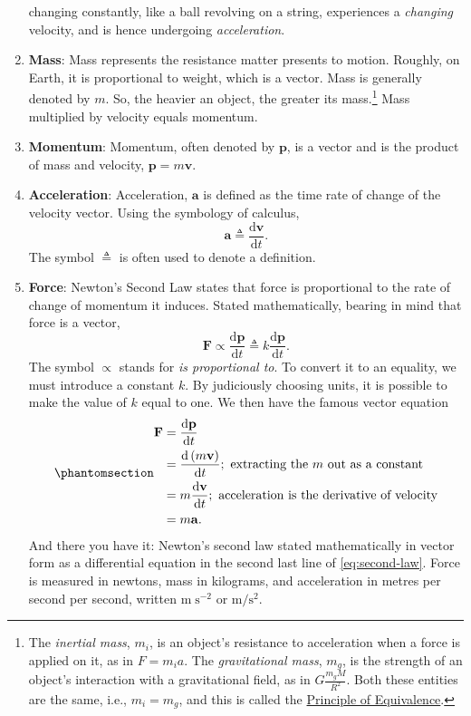 \documentclass[
  a4paper,
]{article}
\begin{document}
\begin{enumerate}
  changing constantly, like a ball revolving on a string, experiences a
  \emph{changing} velocity, and is hence undergoing \emph{acceleration}.
\item
  \textbf{Mass}: Mass represents the resistance matter presents to
  motion. Roughly, on Earth, it is proportional to weight, which is a
  vector. Mass is generally denoted by \(m\). So, the heavier an object,
  the greater its mass.\footnote{The \emph{inertial mass}, \(m_i\), is
    an object's resistance to acceleration when a force is applied on
    it, as in \(F = m_{i}a\). The \emph{gravitational mass}, \(m_g\), is
    the strength of an object's interaction with a gravitational field,
    as in \(G\frac{m_gM}{R^2}\). Both these entities are the same, i.e.,
    \(m_{i} = m_{g}\), and this is called the
    \href{https://en.wikipedia.org/wiki/Equivalence_principle.}{Principle
    of Equivalence}.} Mass multiplied by velocity equals momentum.
\item
  \textbf{Momentum}: Momentum, often denoted by \(\mathbf{p}\), is a
  vector and is the product of mass and velocity,
  \(\mathbf{p} = m\mathbf{v}\).
\item
  \textbf{Acceleration}: Acceleration, \(\mathbf{a}\) is defined as the
  time rate of change of the velocity vector. Using the symbology of
  calculus, \[
  \mathbf{a} \triangleq \frac{\mathrm{d}\mathbf{v}}{\mathrm{d}t}.
  \] The symbol \(\triangleq\) is often used to denote a definition.
\item
  \textbf{Force}: Newton's Second Law states that force is proportional
  to the rate of change of momentum it induces. Stated mathematically,
  bearing in mind that force is a vector, \[
  \mathbf{F} \propto \frac{\mathrm{d}\mathbf{p}}{\mathrm{d}t} \triangleq k\frac{\mathrm{d}\mathbf{p}}{\mathrm{d}t}.
  \] The symbol \(\propto\) stands for \emph{is proportional to}. To
  convert it to an equality, we must introduce a constant \(k\). By
  judiciously choosing units, it is possible to make the value of \(k\)
  equal to one. We then have the famous vector equation
  \begin{equation}\phantomsection\label{eq:second-law}{
  \begin{aligned}
  \mathbf{F} &= \frac{\mathrm{d}\mathbf{p}}{\mathrm{d}t}\\
  &= \frac{\mathrm{d}\left(m\mathbf{v}\right)}{\mathrm{d}t}; \text{ extracting the $m$ out as a constant}\\
  &= m\frac{\mathrm{d}\mathbf{v}}{\mathrm{d}t}; \text{ acceleration is the derivative of velocity}\\
  &= m\mathbf{a}.
  \end{aligned}
  }\end{equation} And there you have it: Newton's second law stated
  mathematically in vector form as a differential equation in the second
  last line of \cref{eq:second-law}. Force is measured in newtons, mass
  in kilograms, and acceleration in metres per second per second,
  written \(\mathrm{m \; s^{-2}}\) or \(\mathrm{m/s^{2}}\).
\end{enumerate}
\end{document}
